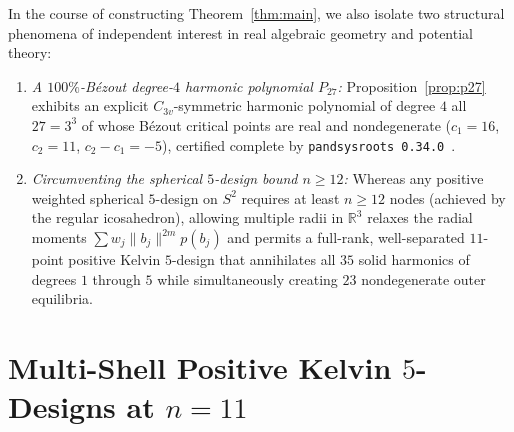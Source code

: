 \documentclass[11pt,a4paper]{amsart}
\theoremstyle{definition}
\newcommand{\R}{\mathbb{R}}
\begin{document}
In the course of constructing Theorem~\ref{thm:main}, we also isolate two
structural phenomena of independent interest in real algebraic geometry and
potential theory:
\begin{enumerate}
  \item \emph{A $100\%$-B\'ezout degree-$4$ harmonic polynomial $P_{27}$:}
  Proposition~\ref{prop:p27} exhibits an explicit $C_{3v}$-symmetric harmonic
  polynomial of degree $4$ all $27 = 3^3$ of whose B\'ezout critical points are
  real and nondegenerate ($c_1 = 16$, $c_2 = 11$, $c_2 - c_1 = -5$), certified
  complete by \texttt{pandsysroots~0.34.0}~\cite{pandsysroots}.
  \item \emph{Circumventing the spherical $5$-design bound $n \ge 12$:}
  Whereas any positive weighted spherical $5$-design on $S^2$ requires at least
  $n \ge 12$ nodes (achieved by the regular icosahedron), allowing multiple
  radii in $\R^3$ relaxes the radial moments $\sum w_j \|b_j\|^{2m} p(b_j)$ and
  permits a full-rank, well-separated $11$-point positive Kelvin $5$-design
  that annihilates all $35$ solid harmonics of degrees $1$ through $5$ while
  simultaneously creating $23$ nondegenerate outer equilibria.
\end{enumerate}

\section{Multi-Shell Positive Kelvin $5$-Designs at $n = 11$}\label{sec:kelvin}
\end{document}
